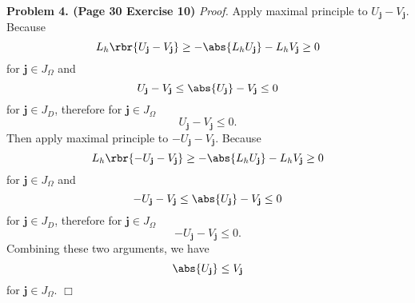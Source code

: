 \documentclass[english, nochinese]{pnote}
\begin{document}
\textbf{Problem 4. (Page 30 Exercise 10)} \textit{Proof.} Apply maximal principle to $ U_{\mathbf{j}} - V_{\mathbf{j}} $. Because
\begin{equation}
L_h \rbr{ U_{\mathbf{j}} - V_{\mathbf{j}} } \ge -\abs{ L_h U_{\mathbf{j}} } - L_h V_{\mathbf{j}} \ge 0
\end{equation}
for $ \mathbf{j} \in J_{\Omega} $ and
\begin{equation}
U_{\mathbf{j}} - V_{\mathbf{j}} \le \abs{U_{\mathbf{j}}} - V_{\mathbf{j}} \le 0
\end{equation}
for $ \mathbf{j} \in J_D $,
therefore for $ \mathbf{j} \in J_{\Omega} $
\begin{equation}
U_{\mathbf{j}} - V_{\mathbf{j}} \le 0.
\end{equation}
Then apply maximal principle to $ -U_{\mathbf{j}} - V_{\mathbf{j}} $. Because
\begin{equation}
L_h \rbr{ -U_{\mathbf{j}} - V_{\mathbf{j}} } \ge -\abs{ L_h U_{\mathbf{j}} } - L_h V_{\mathbf{j}} \ge 0
\end{equation}
for $ \mathbf{j} \in J_{\Omega} $ and
\begin{equation}
-U_{\mathbf{j}} - V_{\mathbf{j}} \le \abs{U_{\mathbf{j}}} - V_{\mathbf{j}} \le 0
\end{equation}
for $ \mathbf{j} \in J_D $,
therefore for $ \mathbf{j} \in J_{\Omega} $
\begin{equation}
-U_{\mathbf{j}} - V_{\mathbf{j}} \le 0.
\end{equation}
Combining these two arguments, we have
\begin{equation}
\abs{U_{\mathbf{j}}} \le V_{\mathbf{j}}
\end{equation}
for $ \mathbf{j} \in J_{\Omega} $.
\hfill$\Box$
\end{document}

